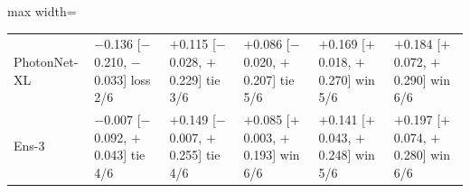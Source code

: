 {\begin{adjustbox}{max width=\linewidth}
\begin{tabular}{p{3.0cm}lllll}
PhotonNet-XL & $-$0.136 [$-$0.210, $-$0.033] loss 2/6 & $+$0.115 [$-$0.028, $+$0.229] tie 3/6 & $+$0.086 [$-$0.020, $+$0.207] tie 5/6 & $+$0.169 [$+$0.018, $+$0.270] win 5/6 & $+$0.184 [$+$0.072, $+$0.290] win 6/6 \\
Ens-3 & $-$0.007 [$-$0.092, $+$0.043] tie 4/6 & $+$0.149 [$-$0.007, $+$0.255] tie 4/6 & $+$0.085 [$+$0.003, $+$0.193] win 6/6 & $+$0.141 [$+$0.043, $+$0.248] win 5/6 & $+$0.197 [$+$0.074, $+$0.280] win 6/6 \\
\bottomrule
\end{tabular}
\end{adjustbox}
}
